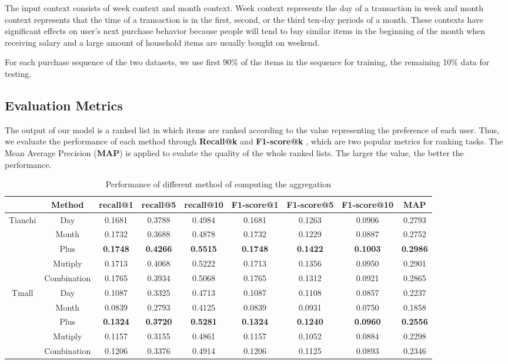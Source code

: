 \documentclass[conference]{IEEEtran}
\begin{document}
The input context consists of week context and month context. Week context represents the day of a transaction in week and month context represents that the time of a transaction is in the first, second, or the third ten-day periods of a month. These contexts have significant effects on user's next purchase behavior because people will tend to buy similar items in the beginning of the month when receiving salary and a large amount of household items are usually bought on weekend.

For each purchase sequence of the two datasets, we use first 90\% of the items in the sequence for training, the remaining 10\% data for testing. 
\subsection{Evaluation Metrics}
The output of our model is a ranked list in which items are ranked according to the value representing the preference of each user. Thus, we evaluate the performance of each method through \textbf{Recall@k} and \textbf{F1-score@k} , which are two popular metrics for ranking tasks. The Mean Average Precision (\textbf{MAP}) is applied to evalute the quality of the whole ranked lists. The larger the value, the better the performance.

\begin{table}[!htbp]
\centering\scriptsize
\caption{Performance of different method of computing the aggregation}
    \begin{tabular}{ccccccccc}
    \toprule
          & Method& recall@1 & recall@5 & recall@10&F1-score@1 & F1-score@5 & F1-score@10&MAP\\
    \midrule
    \multirow{3}[0]{*}{Tianchi} 
        &Day& 0.1681& 0.3788& 0.4984& 0.1681& 0.1263& 0.0906&0.2793\\
        &Month& 0.1732& 0.3688& 0.4878& 0.1732& 0.1229& 0.0887&0.2752\\
        &Plus& \textbf{0.1748}& \textbf{0.4266}& \textbf{0.5515}& \textbf{0.1748}& \textbf{0.1422}& \textbf{0.1003}& \textbf{0.2986}\\
        &Mutiply& 0.1713& 0.4068& 0.5222& 0.1713& 0.1356& 0.0950&0.2901\\
        &Combination& 0.1765& 0.3934& 0.5068& 0.1765& 0.1312& 0.0921&0.2865\\
    \midrule
    \multirow{3}[0]{*}{Tmall} 
        &Day& 0.1087& 0.3325& 0.4713& 0.1087& 0.1108& 0.0857&0.2237\\
        &Month& 0.0839& 0.2793& 0.4125& 0.0839& 0.0931& 0.0750&0.1858\\
        &Plus& \textbf{0.1324}& \textbf{0.3720}& \textbf{0.5281}& \textbf{0.1324}& \textbf{0.1240}& \textbf{0.0960}& \textbf{0.2556}\\
        &Mutiply& 0.1157& 0.3155& 0.4861& 0.1157& 0.1052& 0.0884&0.2298\\
        &Combination& 0.1206& 0.3376& 0.4914& 0.1206& 0.1125& 0.0893&0.2346\\
    \bottomrule
\end{tabular}%
\end{table}%
\end{document}

